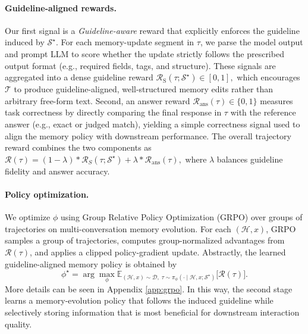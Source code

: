\paragraph{Guideline-aligned rewards.}
Our first signal is a \emph{Guideline-aware} reward that explicitly enforces the guideline induced by \( \mathcal{S}^\star \). For each memory-update segment in \(\tau\), we parse the model output and prompt LLM to score whether the update strictly follows the prescribed output format (e.g., required fields, tags, and structure). These signals are aggregated into a dense guideline reward
\(
\mathcal{R}_{\text{S}}(\tau; \mathcal{S}^\star) \in [0,1],
\)
which encourages \(\mathcal{T}\) to produce guideline-aligned, well-structured memory edits rather than arbitrary free-form text. 
 Second, an answer reward \( \mathcal{R}_{\text{ans}}(\tau)  \in \{0,1\}\) measures task correctness by directly comparing the final response in \(\tau\) with the reference answer (e.g., exact or judged match), yielding a simple correctness signal used to align the memory policy with downstream performance. The overall trajectory reward combines the two components as
\(
\mathcal{R}(\tau) = (1-\lambda) * \mathcal{R}_{S}(\tau; \mathcal{S}^\star) + \lambda *  \mathcal{R}_{\text{ans}}(\tau),
\)
where \( \lambda \) balances guideline fidelity and answer accuracy.


\paragraph{Policy optimization.}
 We optimize \( \phi \) using Group Relative Policy Optimization (GRPO) over groups of trajectories on multi-conversation memory evolution. For each \((\mathcal{H},x)\), GRPO samples a group of trajectories, computes group-normalized advantages from \( \mathcal{R}(\tau) \), and applies a clipped policy-gradient update. Abstractly, the learned guideline-aligned memory policy is obtained by
\begin{equation}
\phi^\star
=
\arg\max_{\phi}
\mathbb{E}_{(\mathcal{H},x)\sim\mathcal{D},\;
\tau \sim \pi_\phi(\cdot \mid \mathcal{H},x;\mathcal{S}^\star)}
\big[
\mathcal{R}(\tau) 
\big].
\end{equation}
More details can be seen in Appendix \ref{app:grpo}. 
In this way, the second stage learns a memory-evolution policy that follows the induced guideline while selectively storing information that is most beneficial for downstream interaction quality.
